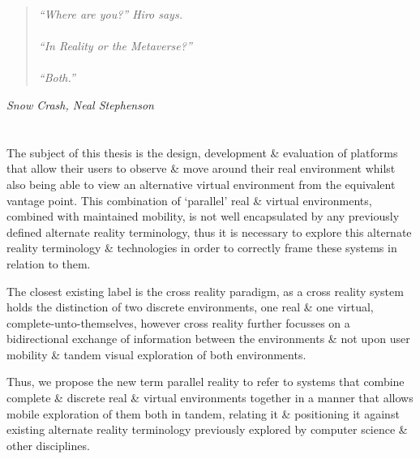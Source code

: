 \begin{quote}
\textit{``Where are you?'' Hiro says.
\\
\\
``In Reality or the Metaverse?''
\\
\\
``Both.''}
\end{quote}
\hfill \textit{Snow Crash, Neal Stephenson}
\\
\\
\\




The subject of this thesis is the design, development \& evaluation of platforms that allow their users to observe \& move around their real environment whilst also being able to view an alternative virtual environment from the equivalent vantage point. This combination of `parallel' real \& virtual environments, combined with maintained mobility, is not well encapsulated by any previously defined alternate reality terminology, thus it is necessary to explore this alternate reality terminology \& technologies in order to correctly frame these systems in relation to them.

The closest existing label is the cross reality paradigm, as a cross reality system holds the distinction of two discrete environments, one real \& one virtual, complete-unto-themselves, however cross reality further focusses on a bidirectional exchange of information between the environments \& not upon user mobility \& tandem visual exploration of both environments.

Thus, we propose the new term parallel reality to refer to systems that combine complete \& discrete real \& virtual environments together in a manner that allows mobile exploration of them both in tandem, relating it \& positioning it against existing alternate reality terminology previously explored by computer science \& other disciplines.


